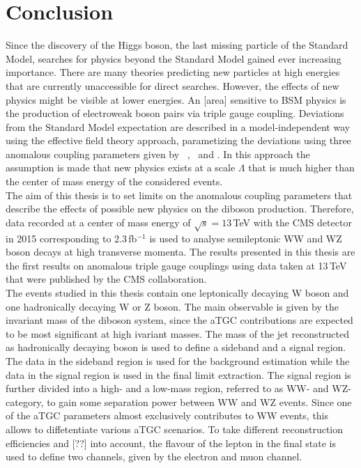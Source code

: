\chapter{Conclusion}
\label{ch:Conclusion}
Since the discovery of the Higgs boson, the last missing particle of the Standard Model, searches for physics beyond the Standard Model gained ever increasing importance. There are many theories predicting new particles at high energies that are currently unaccessible for direct searches. However, the effects of new physics might be visible at lower energies. An [area] sensitive to BSM physics is the production of electroweak boson pairs via triple gauge coupling. Deviations from the Standard Model expectation are described in a model-independent way using the effective field theory approach, parametizing the deviations using three anomalous coupling parameters given by \Tcwww \ , \Tccw \ and \Tcb . In this approach the assumption is made that new physics exists at a scale $\Lambda$ that is much higher than the center of mass energy of the considered events.\\

The aim of this thesis is to set limits on the anomalous coupling parameters that describe the effects of possible new physics on the diboson production. Therefore, data recorded at a center of mass energy of $\sqrt{s}=13$\,TeV with the CMS detector in 2015 corresponding to 2.3\,fb$^{-1}$ is used to analyse semileptonic WW and WZ boson decays at high transverse momenta. The results presented in this thesis are the first results on anomalous triple gauge couplings using data taken at 13\,TeV that were published by the CMS collaboration.\\

The events studied in this thesis contain one leptonically decaying W boson and one hadronically decaying W or Z boson. The main observable is given by the invariant mass of the diboson system, since the aTGC contributions are expected to be most significant at high ivariant masses. The mass of the jet reconstructed as hadronically decaying boson is used to define a sideband and a signal region. The data in the sideband region is used for the background estimation while the data in the signal region is used in the final limit extraction. The signal region is further divided into a high- and a low-mass region, referred to as WW- and WZ-category, to gain some separation power between WW and WZ events. Since one of the aTGC parameters almost exclusively contributes to WW events, this allows to diffetentiate various aTGC scenarios. To take different reconstruction efficiencies and [??] into account, the flavour of the lepton in the final state is used to define two channels, given by the electron and muon channel.\\

